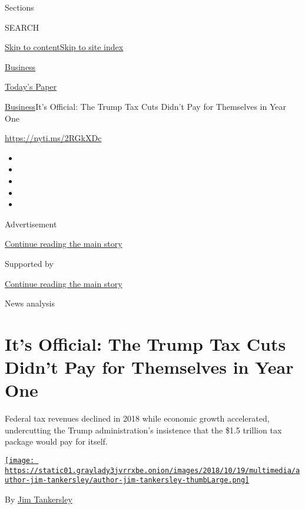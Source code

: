 Sections

SEARCH

\protect\hyperlink{site-content}{Skip to
content}\protect\hyperlink{site-index}{Skip to site index}

\href{https://www.nytimes3xbfgragh.onion/section/business}{Business}

\href{https://myaccount.nytimes3xbfgragh.onion/auth/login?response_type=cookie\&client_id=vi}{}

\href{https://www.nytimes3xbfgragh.onion/section/todayspaper}{Today's
Paper}

\href{/section/business}{Business}\textbar{}It's Official: The Trump Tax
Cuts Didn't Pay for Themselves in Year One

\url{https://nyti.ms/2RGkXDc}

\begin{itemize}
\item
\item
\item
\item
\item
\end{itemize}

Advertisement

\protect\hyperlink{after-top}{Continue reading the main story}

Supported by

\protect\hyperlink{after-sponsor}{Continue reading the main story}

News analysis

\hypertarget{its-official-the-trump-tax-cuts-didnt-pay-for-themselves-in-year-one}{%
\section{It's Official: The Trump Tax Cuts Didn't Pay for Themselves in
Year
One}\label{its-official-the-trump-tax-cuts-didnt-pay-for-themselves-in-year-one}}

Federal tax revenues declined in 2018 while economic growth accelerated,
undercutting the Trump administration's insistence that the \$1.5
trillion tax package would pay for itself.

\href{https://www.nytimes3xbfgragh.onion/by/jim-tankersley}{\texttt{[image: https://static01.graylady3jvrrxbe.onion/images/2018/10/19/multimedia/author-jim-tankersley/author-jim-tankersley-thumbLarge.png]}}

By \href{https://www.nytimes3xbfgragh.onion/by/jim-tankersley}{Jim
Tankersley}

